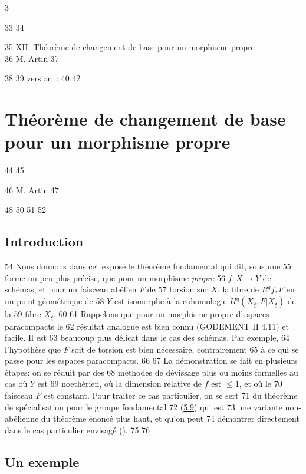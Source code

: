 3	\documentclass[10pt]{../fichiers-configuration-latex/smfart}
\begin{document}
    33	
    34	\begin{center}
    35	XII. Théorème de changement de base pour un morphisme propre\\
    36	M. Artin 
    37	\end{center}
    38	
    39	version : \showgitstatus{}
    40		
    42		\chapter{Théorème de changement de base pour un morphisme propre}
    44	%
    45	\begin{center}
    46	M. Artin 
    47	\end{center}
    48		
    50	\setcounter{pageoriginal}{78}
    51	
    52	\section{Introduction}	
    54	Nous donnons dans cet exposé le théorème fondamental qui dit, sous une
    55	forme un peu plus précise, que pour un morphisme \emph{propre}
    56	$f:X\rightarrow Y$ de schémas, et pour un faisceau abélien $F$ de
    57	torsion sur $X$, la fibre de $R^qf_{\ast}F$ en un point géométrique de
    58	$Y$ est isomorphe à la cohomologie $H^q(X_{\xi}, F| X_{\xi})$ de la
    59	fibre $X_{\xi}$.
    60	
    61	Rappelons que pour un morphisme propre d'espaces paracompacts le
    62	résultat analogue est bien connu (GODEMENT II 4.11) et facile. Il est
    63	beaucoup plus délicat dans le cas des schémas. Par exemple,
    64	l'hypothèse que $F$ soit de torsion est bien nécessaire, contrairement
    65	à ce qui se passe pour les espaces paracompacts.
    66	
    67	La démonstration se fait en plusieurs étapes: on se réduit par des
    68	méthodes de dévissage plus ou moins formelles au cas où $Y$ est
    69	noethérien, où la dimension relative de $f$ est $\leq 1$, et où le
    70	faisceau $F$ est constant. Pour traiter ce cas particulier, on se sert
    71	du théorème de spécialisation pour le groupe fondamental
    72	(\hyperref[XII.thm5.9]{5.9}) qui est 
    73	une variante non-abélienne du théorème énoncé plus haut, et qu'on peut
    74	démontrer directement dans le cas particulier envisagé ().
    75	
    76	\section{Un exemple}\pageoriginale
\end{document}
